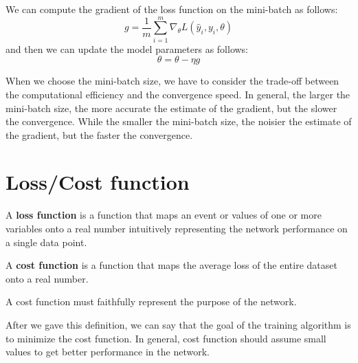 We can compute the gradient of the loss function on the mini-batch as follows:
\begin{equation}
    g = \frac{1}{m} \sum_{i = 1}^{m} \nabla_{\theta} L(\hat{y}_i, y_i, \theta)
\end{equation}
and then we can update the model parameters as follows:
\begin{equation}
    \theta = \theta - \eta g
\end{equation}

When we choose the mini-batch size, we have to consider the trade-off between
the computational efficiency and the convergence speed. In general, the larger
the mini-batch size, the more accurate the estimate of the gradient, but the
slower the convergence. While the smaller the mini-batch size, the noisier the
estimate of the gradient, but the faster the convergence.
\section{Loss/Cost function}
\begin{definition}
    A \textbf{loss function} is a function that maps an event or values of one
    or more variables onto a real number intuitively representing the network
    performance on a single data point.
\end{definition}
\begin{definition}
    A \textbf{cost function} is a function that maps the average loss of the
    entire dataset onto a real number.

    A cost function must faithfully represent the purpose of the network.
\end{definition}

After we gave this definition, we can say that the goal of the training algorithm
is to minimize the cost function. In general, cost function should assume small
values to get better performance in the network.

